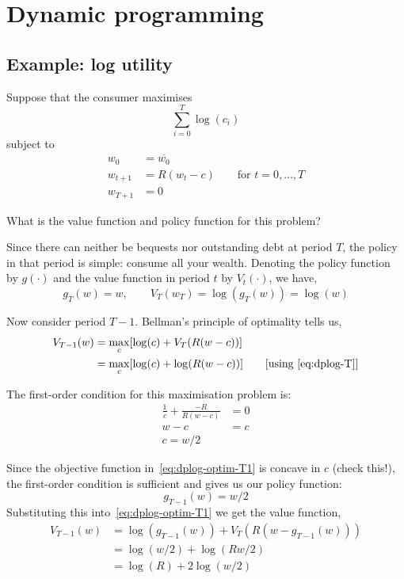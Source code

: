 \documentclass[12pt,reqno]{amsart}
\begin{document}
\section{Dynamic programming}
\subsection{Example: log utility}
Suppose that the consumer maximises
\[\sum_{i=0}^T \log(c_i)\]
subject to
\begin{align*}
  w_0&=\overline{w_0}\\
  w_{t+1}&=R(w_t-c)\qquad \text{for $t=0,\ldots,T$}\\
  w_{T+1}&=0
\end{align*}

What is the value function and policy function for this problem?

Since there can neither be bequests nor outstanding debt at period
$T$, the policy in that period is simple: consume all your
wealth. Denoting the policy function by $g(\cdot)$ and the value
function in period $t$ by $V_t(\cdot)$, we have,
\begin{equation}\label{eq:dplog-T}
g_T(w) = w,\qquad V_T(w_T) = \log(g_T(w))=\log(w)
\end{equation}

Now consider period $T-1$. Bellman's principle of optimality tells us,
\begin{equation}\label{eq:dplog-optim-T1}
\begin{split}
V_{T-1}(w)&=\max_{c} [\log(c) + V_T(R(w-c))]\\
&=\max_{c} [\log(c) +
\log(R(w-c))]\qquad\text{[using~\eqref{eq:dplog-T}]}
\end{split}
\end{equation}

The first-order condition for this maximisation problem is:
\begin{equation*}
\begin{split}
\frac{1}{c}+\frac{-R}{R(w-c)}&=0\\
w-c&=c\\
c=w/2
\end{split}
\end{equation*}

Since the objective function in~\eqref{eq:dplog-optim-T1} is concave
in $c$ (check this!), the first-order condition is sufficient
and gives us our policy function:
\begin{equation*}
g_{T-1}(w)=w/2
\end{equation*}
Substituting this into~\eqref{eq:dplog-optim-T1} we get the value
function,
\begin{equation}\label{eq:dplog-VT1}
\begin{split}
V_{T-1}(w)&=\log(g_{T-1}(w))+V_T(R(w-g_{T-1}(w)))\\
&=\log(w/2)+\log(Rw/2)\\
&=\log(R)+2\log(w/2)
\end{split}
\end{equation}
\end{document}
